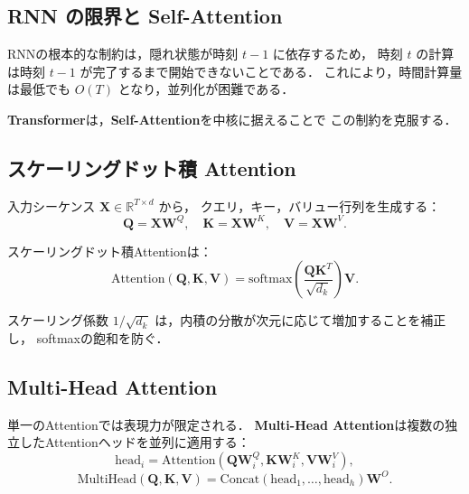 \subsection{RNN の限界と Self-Attention}

RNNの根本的な制約は，隠れ状態が時刻 $t-1$ に依存するため，
時刻 $t$ の計算は時刻 $t-1$ が完了するまで開始できないことである．
これにより，時間計算量は最低でも $O(T)$ となり，並列化が困難である．

\textbf{Transformer}\cite{Vaswani2017}は，\textbf{Self-Attention}を中核に据えることで
この制約を克服する．

\subsection{スケーリングドット積 Attention}

入力シーケンス $\mathbf{X} \in \mathbb{R}^{T \times d}$ から，
クエリ，キー，バリュー行列を生成する：
\begin{equation}
  \mathbf{Q} = \mathbf{X} \mathbf{W}^Q, \quad \mathbf{K} = \mathbf{X} \mathbf{W}^K, \quad \mathbf{V} = \mathbf{X} \mathbf{W}^V.
\end{equation}

スケーリングドット積Attentionは：
\begin{equation}
  \mathrm{Attention}(\mathbf{Q}, \mathbf{K}, \mathbf{V}) = \mathrm{softmax}\left(\frac{\mathbf{Q}\mathbf{K}^T}{\sqrt{d_k}}\right)\mathbf{V}.
  \label{eq:scaled-dot-product}
\end{equation}

スケーリング係数 $1/\sqrt{d_k}$ は，内積の分散が次元に応じて増加することを補正し，
softmaxの飽和を防ぐ．

\subsection{Multi-Head Attention}

単一のAttentionでは表現力が限定される．
\textbf{Multi-Head Attention}は複数の独立したAttentionヘッドを並列に適用する：
\begin{equation}
  \mathrm{head}_i = \mathrm{Attention}(\mathbf{Q}\mathbf{W}_i^Q, \mathbf{K}\mathbf{W}_i^K, \mathbf{V}\mathbf{W}_i^V),
\end{equation}
\begin{equation}
  \mathrm{MultiHead}(\mathbf{Q}, \mathbf{K}, \mathbf{V}) = \mathrm{Concat}(\mathrm{head}_1, \ldots, \mathrm{head}_h) \mathbf{W}^O.
  \label{eq:multi-head}
\end{equation}

